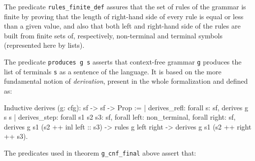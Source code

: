 \documentclass {elsarticle}
\begin{document}
The predicate \texttt {rules\_finite\_def} assures that the set of rules of the grammar is finite by proving that the length of right-hand side of every rule is equal or less than a given value, and also that both left and right-hand side of the rules are built from finite sets of, respectively, non-terminal and terminal symbols (represented here by lists).

The predicate \texttt {produces g s} asserts that context-free grammar \texttt {g} produces the list of terminals \texttt {s} as a sentence of the language. It is based on the more fundamental notion of \emph {derivation}, present in the whole formalization and defined as:

\begin{coq}
Inductive derives (g: cfg): sf -> sf -> Prop :=
| derives_refl: 
         forall s: sf,
         derives g s s
| derives_step: 
         forall s1 s2 s3: sf,
         forall left: non_terminal,
         forall right: sf,
         derives g s1 (s2 ++ inl left :: s3) ->
         rules g left right ->
         derives g s1 (s2 ++ right ++ s3).
\end{coq}

The predicates used in theorem \texttt {g\_cnf\_final} above assert that:
\end{document}

